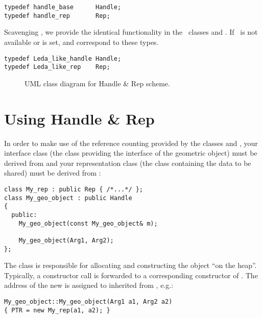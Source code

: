 \begin{verbatim}
typedef handle_base      Handle;
typedef handle_rep       Rep;
\end{verbatim}

Scavenging \leda, we provide the identical functionality in the \cgal\ classes
%
 and %
. If \leda\ is not available or
 is set,  and  correspond to
these types.

\begin{verbatim}
typedef Leda_like_handle Handle;
typedef Leda_like_rep    Rep;
\end{verbatim}

\begin{figure}[ht]
\caption{UML class diagram for Handle \& Rep scheme.\label{fig:HandleRep}}
\end{figure}

\section{Using Handle \& Rep}
In order to make use of the reference counting provided by the
classes  and , your interface class (the class providing
the interface of the geometric object) must be derived from  and
your representation class (the class containing the data to be shared) must be 
derived from :

\begin{verbatim}
class My_rep : public Rep { /*...*/ };
class My_geo_object : public Handle 
{
  public:
    My_geo_object(const My_geo_object& m);

    My_geo_object(Arg1, Arg2);
};
\end{verbatim}

The class  is responsible for allocating and constructing
the  object ``on the heap''. 
Typically, a constructor call is forwarded to a
corresponding constructor of . The address of the new   is assigned to  inherited from , e.g.:

\begin{verbatim}
My_geo_object::My_geo_object(Arg1 a1, Arg2 a2)
{ PTR = new My_rep(a1, a2); }
\end{verbatim}


